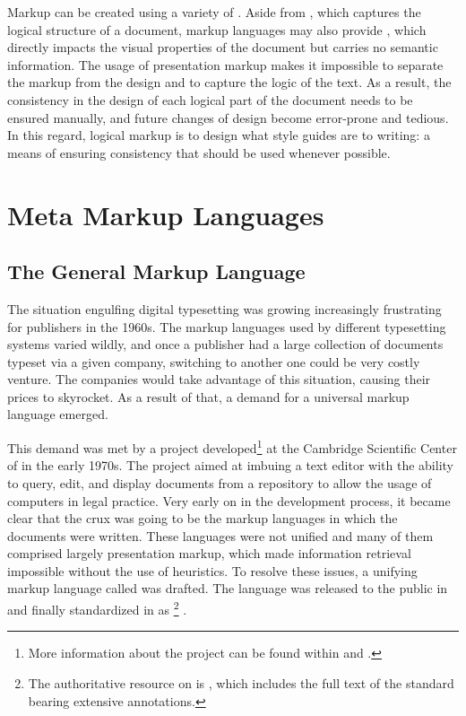 \documentclass[
  a5paper,10pt,           %
  dvipsnames              %
]{book}
\begin{document}
Markup can be created using a variety of . Aside from
, which captures the logical structure of a document,
markup languages may also provide , which directly
impacts the visual properties of the document but carries no semantic
information. The usage of presentation markup makes it impossible to separate
the markup from the design and to capture the logic of the text. As a result,
the consistency in the design of each logical part of the document needs to be
ensured manually, and future changes of design become error-prone and tedious.
In this regard, logical markup is to design what style guides are to writing: a
means of ensuring consistency that should be used whenever possible.

\section{Meta Markup Languages}
\subsection{The General Markup Language}
The situation engulfing digital typesetting was growing increasingly frustrating
for publishers in the 1960s. The markup languages used by different typesetting
systems varied wildly, and once a publisher had a large collection of documents
typeset via a given company, switching to another one could be very costly
venture. The companies would take advantage of this situation, causing their
prices to skyrocket. As a result of that, a demand for a universal markup
language emerged.

This demand was met by a project developed\footnote{
  More information about the project can be found within
   and .
} at the Cambridge Scientific Center of  in the early 1970s. The
project aimed at imbuing a text editor with the ability to query, edit, and
display documents from a repository to allow the usage of computers in legal
practice. Very early on in the development process, it became clear that the
crux was going to be the markup languages in which the documents were written.
These languages were not unified and many of them comprised largely presentation
markup, which made information retrieval impossible without the use of
heuristics. To resolve these issues, a unifying markup language called
 was drafted. The language was released \cite{goldfarb81}
to the public in \citeyear{goldfarb81} and finally standardized in
\citeyear{iso86} as \footnote{
  The authoritative resource on  is , which
  includes the full text of the standard bearing extensive annotations.
} \cite{iso86}.
\end{document}
